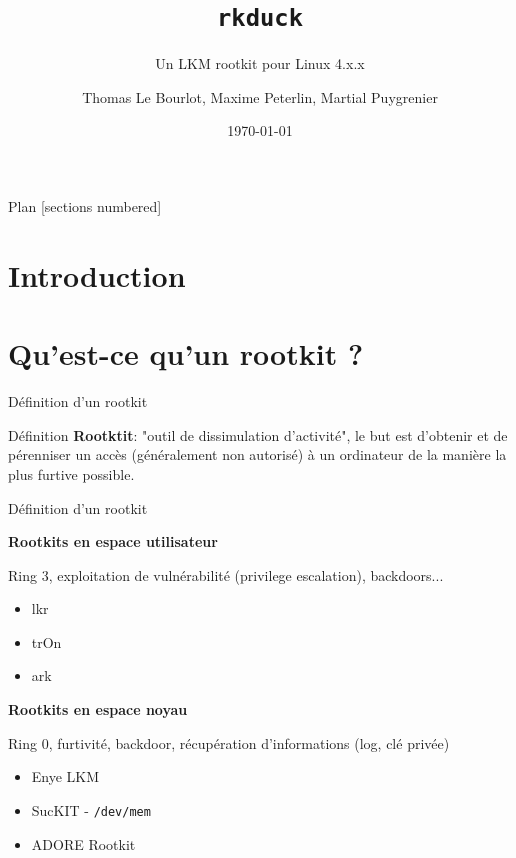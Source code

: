 \documentclass[10pt]{beamer}
\title{\texttt{rkduck}}
\subtitle{Un LKM rootkit pour Linux 4.x.x}
\date{\today}
\author{Thomas Le Bourlot, Maxime Peterlin, Martial Puygrenier}
\institute{Université de Bordeaux}
\begin{document}
\maketitle

\begin{frame}{Plan}
  [sections numbered]
  \tableofcontents[hideallsubsections]
\end{frame}

\section*{Introduction}


\section{Qu'est-ce qu'un rootkit ?}


	

	\begin{frame}{Définition d'un rootkit}
	
	\begin{alertblock}{Définition}
		\textbf{Rootktit}: "outil de dissimulation d'activité", le but est d'obtenir et de pérenniser un accès (généralement non autorisé) à un ordinateur de la manière la plus furtive possible.
    \end{alertblock}
    
	\end{frame}
	
		\begin{frame}{Définition d'un rootkit}

    
		\textbf{Rootkits en espace utilisateur}
		
		Ring 3, exploitation de vulnérabilité (privilege escalation), backdoors...
		\begin{itemize}
			\item lkr
			\item trOn
			\item ark
		\end{itemize}
		
		\textbf{Rootkits en espace noyau}
		
		Ring 0, furtivité, backdoor, récupération d'informations (log, clé privée)
		\begin{itemize}
			\item Enye LKM
			\item SucKIT - \texttt{/dev/mem}
			\item ADORE Rootkit
		\end{itemize}
	\end{frame}
\end{document}

